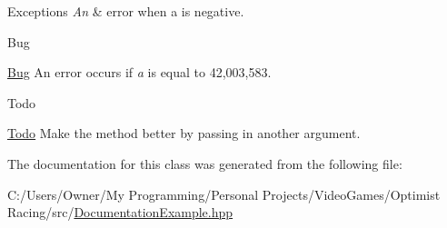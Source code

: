 \begin{DoxyExceptions}{Exceptions}
{\em An} & error when a is negative. \\
\hline
\end{DoxyExceptions}
\begin{DoxyRefDesc}{Bug}
\item[\hyperlink{bug__bug000007}{Bug}]An error occurs if {\itshape a} is equal to 42,003,583. \end{DoxyRefDesc}
\begin{DoxyRefDesc}{Todo}
\item[\hyperlink{todo__todo000005}{Todo}]Make the method better by passing in another argument. \end{DoxyRefDesc}


The documentation for this class was generated from the following file\-:\begin{DoxyCompactItemize}
\item 
C\-:/\-Users/\-Owner/\-My Programming/\-Personal Projects/\-Video\-Games/\-Optimist Racing/src/\hyperlink{_documentation_example_8hpp}{Documentation\-Example.\-hpp}\end{DoxyCompactItemize}
